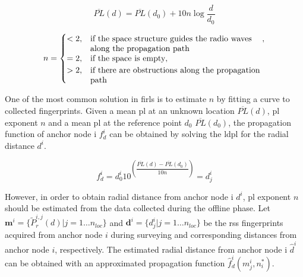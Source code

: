 
    \begin{equation}
        \label{eq:log-distance}
        \overline{PL}(d) = \overline{PL}(d_0) + 10 n \log{\dfrac{d}{d_0}}
    \end{equation}

    \begin{equation}
        n =
        \begin{cases}
            <2,& \parbox[t]{.6\textwidth}{if the space structure guides the radio waves\\
                                        along the propagation path}, \\
            =2,& \text{if the space is empty}, \\
            >2,& \parbox[t]{.6\textwidth}{if there are obstructions along the propagation\\
                                        path}
        \end{cases}
    \end{equation}

    One of the most common solution in \gls{firl}s is to estimate $n$ by fitting a curve to collected fingerprints.
    Given a mean \gls{pl} at an unknown location $\overline{PL}(d)$, \gls{pl} exponent $n$ and a mean \gls{pl} at the reference point $d_0$ $\overline{PL}(d_0)$, the propagation function of anchor node i $f^i_{d}$ can be obtained by solving the \gls{ldpl} for the radial distance $d^i$.

    \begin{equation}
      \label{eq:log-distance-d}
      f^i_{d} = d^i_0 10^{\left(\dfrac{\overline{PL}(d)-\overline{PL}(d_0)}{10 n} \right)} = d^i_j
    \end{equation}


    However, in order to obtain radial distance from anchor node i $d^i$, \gls{pl} exponent $n$ should be estimated from the data collected during the offline phase.
    Let $\bm{m}^i = \{\widetilde{P}_r^{i,j}(d) | j=1 \ldots n_{loc} \}$ and $\bm{d}^i = \{ d^i_j | j = 1 \ldots n_{loc}\}$ be the \gls{rss} fingerprints acquired from anchor node $i$ during surveying and corresponding distances from anchor node $i$, respectively.
    The estimated radial distance from anchor node i $\hat{d}^i$ can be obtained with an approximated propagation function $\hat{f}^i_d(m^i_j, n_i^*)$.

